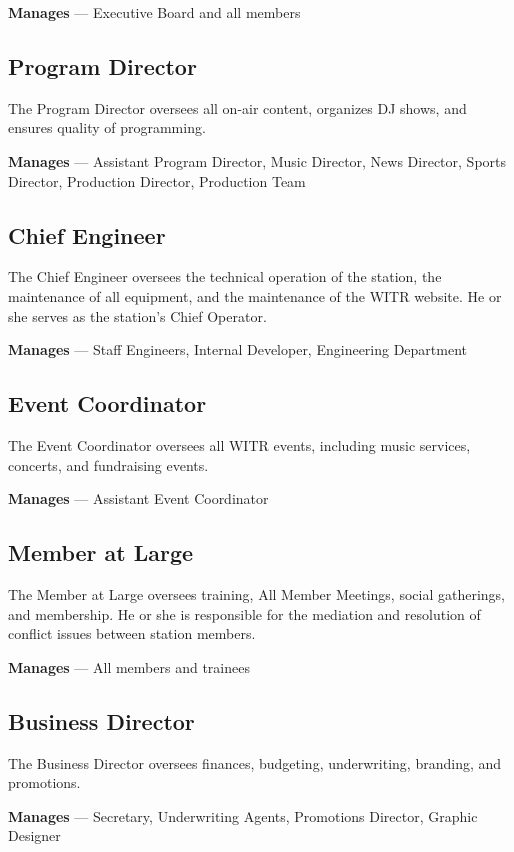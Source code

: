 \documentclass{witrman}
\begin{document}
\textbf{Manages} --- Executive Board and all members

\subsection{Program Director}
The Program Director oversees all on-air content, organizes DJ shows, and
ensures quality of programming.

\textbf{Manages} --- Assistant Program Director, Music Director, News Director,
Sports Director, Production Director, Production Team

\subsection{Chief Engineer}
The Chief Engineer oversees the technical operation of the station, the
maintenance of all equipment, and the maintenance of the WITR website. He or she
serves as the station’s Chief Operator.

\textbf{Manages} --- Staff Engineers, Internal Developer, Engineering Department

\subsection{Event Coordinator}
The Event Coordinator oversees all WITR events, including music services,
concerts, and fundraising events.

\textbf{Manages} --- Assistant Event Coordinator

\subsection{Member at Large}
The Member at Large oversees training, All Member Meetings, social gatherings,
and membership. He or she is responsible for the mediation and resolution of
conflict issues between station members.

\textbf{Manages} --- All members and trainees

\subsection{Business Director}
The Business Director oversees finances, budgeting, underwriting, branding, and
promotions.

\textbf{Manages} --- Secretary, Underwriting Agents, Promotions Director,
Graphic Designer
\end{document}
